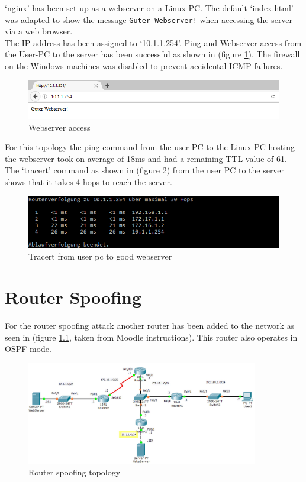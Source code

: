 `nginx' has been set up as a webserver on a Linux-PC. The default `index.html' was adapted to show the message \texttt{Guter Webserver!} when accessing the server via a web browser. \\
The IP address has been assigned to `10.1.1.254'.
Ping and Webserver access from the User-PC to the server has been successful as shown in (figure \ref{img:GuterWebserverScreenshot}). The firewall on the Windows machines was disabled to prevent accidental ICMP failures.

\begin{figure}[H]
	\centering
	\includegraphics[width=1.0\textwidth]{img/GuterWebserverScreenshot.png}
	\caption{Webserver access}
	\label{img:GuterWebserverScreenshot}
\end{figure}

For this topology the ping command from the user PC to the Linux-PC hosting the webserver took on average of 18ms and had a remaining \ac{TTL} value of 61.
The `tracert' command as shown in (figure \ref{img:TracertGuterWebserver}) from the user PC to the server shows that it takes 4 hops to reach the server.

\begin{figure}[H]
	\centering
	\includegraphics[width=1.0\textwidth]{img/TracertGuterWebserver.png}
	\caption{Tracert from user pc to good webserver}
	\label{img:TracertGuterWebserver}
\end{figure}

\chapter{Router Spoofing}

For the router spoofing attack another router has been added to the network as seen in (figure \ref{img:Router spoofing topology}, taken from Moodle instructions). This router also operates in \ac{OSPF} mode. 

\begin{figure}[H]
	\centering
	\includegraphics[width=0.9\textwidth]{img/topo_spoofing.png}
	\caption{Router spoofing topology}
	\label{img:Router spoofing topology}
\end{figure}

